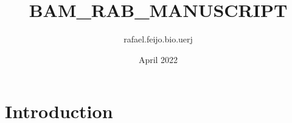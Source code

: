 \documentclass{article}
\title{BAM_RAB_MANUSCRIPT}
\author{rafael.feijo.bio.uerj }
\date{April 2022}
\begin{document}
\maketitle

\section{Introduction}
\end{document}
